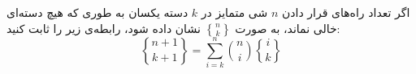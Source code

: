     \p
    اگر تعداد راه‌های قرار دادن $n$ شی متمایز در $k$ دسته یکسان به طوری که هیچ دسته‌ای خالی نماند،
    به صورت 
    $\genfrac{\{}{\}}{0pt}{}{n}{k}$
    نشان داده ‌شود، رابطه‌ی زیر را ثابت کنید:        
    $$\genfrac{\{}{\}}{0pt}{}{n + 1}{k + 1} = \sum\limits_{i=k}^{n} {n\choose i} \genfrac{\{}{\}}{0pt}{}{i}{k}$$